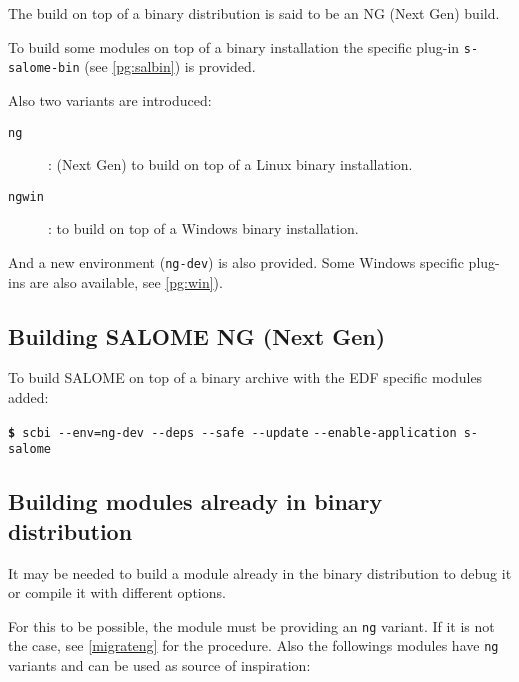 \documentclass[a4paper,12pt,twoside]{article}
\newcommand{\code}[1]{\texttt{#1}}
\newcommand{\cmd}[1]{\tabto{1cm}\hspace{0.5cm}\texttt{\textbf{\$} #1}}
\newcommand{\cmdc}[1]{\tabto{1cm}\hspace{1.5cm}\texttt{#1}}
\newcommand{\ddash}{-{}-}
\begin{document}
The build on top of a binary distribution is said to be an NG (Next Gen) build.

To build some modules on top of a binary installation the specific plug-in \code{s-salome-bin} (see \ref{pg:salbin}) is provided.

Also two variants are introduced:

\begin{description}
	\item[\code{ng}] : (Next Gen) to build on top of a Linux binary installation.
	\item[\code{ngwin}] : to build on top of a Windows binary installation.
\end{description}

And a new environment (\code{ng-dev}) is also provided. Some Windows specific plug-ins are also available, see \ref{pg:win}).

\subsection{Building SALOME NG (Next Gen)}

To build SALOME on top of a binary archive with the EDF specific modules added:

\cmd{scbi \ddash{}env=ng-dev \ddash{}deps \ddash{}safe \ddash{}update}
\cmdc{\ddash{}enable-application s-salome}

\subsection{Building modules already in binary distribution}

It may be needed to build a module already in the binary distribution to debug it or compile it with different options.

For this to be possible, the module must be providing an \code{ng} variant. If it is not the case, see \ref{migrateng} for the procedure. Also the followings modules have \code{ng} variants and can be used as source of inspiration:
\end{document}
